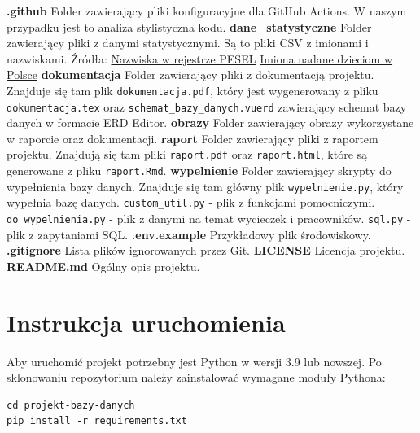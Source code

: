 \documentclass[a4paper,12pt]{mwart}
\begin{document}
\begin{outline}
    \1 \textbf{.github}
        \2 Folder zawierający pliki konfiguracyjne dla GitHub Actions. W naszym przypadku jest to analiza stylistyczna kodu.
    \1 \textbf{dane\_statystyczne}
        \2 Folder zawierający pliki z danymi statystycznymi. Są to pliki CSV z imionami i nazwiskami.
            \3 Źródła:
                \4 \href{https://dane.gov.pl/en/dataset/1681,nazwiska-osob-zyjacych-wystepujace-w-rejestrze-pesel}{Nazwiska w rejestrze PESEL}
                \4 \href{https://dane.gov.pl/en/dataset/219,imiona-nadawane-dzieciom-w-polsce}{Imiona nadane dzieciom w Polsce}
    \1 \textbf{dokumentacja}
        \2 Folder zawierający pliki z dokumentacją projektu. Znajduje się tam plik \texttt{dokumentacja.pdf}, który jest wygenerowany z pliku \texttt{dokumentacja.tex} oraz \texttt{schemat\_bazy\_danych.vuerd} zawierający schemat bazy danych w formacie ERD Editor. 
    \1 \textbf{obrazy}
        \2 Folder zawierający obrazy wykorzystane w raporcie oraz dokumentacji. 
    \1 \textbf{raport}
        \2 Folder zawierający pliki z raportem projektu. Znajdują się tam pliki \texttt{raport.pdf} oraz \texttt{raport.html}, które są generowane z pliku \texttt{raport.Rmd}.
    \1 \textbf{wypelnienie}
        \2 Folder zawierający skrypty do wypełnienia bazy danych. Znajduje się tam główny plik \texttt{wypelnienie.py}, który wypełnia bazę danych.
            \3 \texttt{custom\_util.py} - plik z funkcjami pomocniczymi.
            \3 \texttt{do\_wypelnienia.py} - plik z danymi na temat wycieczek i pracowników.
            \3 \texttt{sql.py} - plik z zapytaniami SQL.
    \1 \textbf{.env.example}
        \2 Przykładowy plik środowiskowy.
    \1 \textbf{.gitignore}
        \2 Lista plików ignorowanych przez Git.
    \1 \textbf{LICENSE}
        \2 Licencja projektu.
    \1 \textbf{README.md}
        \2 Ogólny opis projektu.
\end{outline}


\section{Instrukcja uruchomienia}

Aby uruchomić projekt potrzebny jest Python w wersji 3.9 lub nowszej. Po sklonowaniu repozytorium należy zainstalować wymagane moduły Pythona:

\begin{verbatim}
cd projekt-bazy-danych
pip install -r requirements.txt
\end{verbatim}
\end{document}
